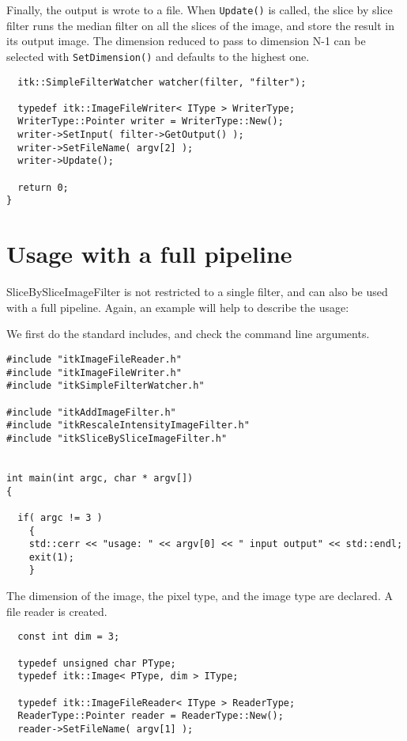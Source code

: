\documentclass{InsightArticle}
\begin{document}
Finally, the output is wrote to a file. When \verb$Update()$ is called, the
slice by slice filter runs the median filter on all the slices of the image,
and store the result in its output image. The dimension reduced to pass to
dimension N-1 can be selected with \verb$SetDimension()$ and defaults to
the highest one.
\small \begin{verbatim}
  itk::SimpleFilterWatcher watcher(filter, "filter");

  typedef itk::ImageFileWriter< IType > WriterType;
  WriterType::Pointer writer = WriterType::New();
  writer->SetInput( filter->GetOutput() );
  writer->SetFileName( argv[2] );
  writer->Update();

  return 0;
}
\end{verbatim} \normalsize


\section{Usage with a full pipeline}

SliceBySliceImageFilter is not restricted to a single filter, and can also be used with a full pipeline.
Again, an example will help to describe the usage:

We first do the standard includes, and check the command line arguments.

\small \begin{verbatim}
#include "itkImageFileReader.h"
#include "itkImageFileWriter.h"
#include "itkSimpleFilterWatcher.h"

#include "itkAddImageFilter.h"
#include "itkRescaleIntensityImageFilter.h"
#include "itkSliceBySliceImageFilter.h"


int main(int argc, char * argv[])
{

  if( argc != 3 )
    {
    std::cerr << "usage: " << argv[0] << " input output" << std::endl;
    exit(1);
    }
\end{verbatim} \normalsize

The dimension of the image, the pixel type, and the image type are declared.
A file reader is created.

\small \begin{verbatim}
  const int dim = 3;
  
  typedef unsigned char PType;
  typedef itk::Image< PType, dim > IType;

  typedef itk::ImageFileReader< IType > ReaderType;
  ReaderType::Pointer reader = ReaderType::New();
  reader->SetFileName( argv[1] );
\end{verbatim} \normalsize
\end{document}
